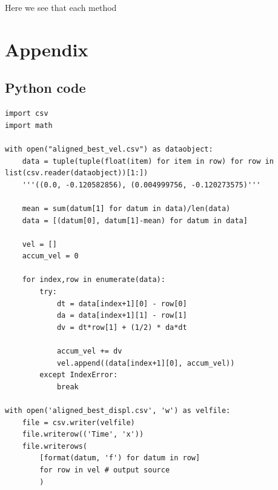 \documentclass[12pt]{article}
\begin{document}
    

Here we see that each method 
    
\section{Appendix}

\subsection{Python code}
\begin{verbatim}
import csv
import math

with open("aligned_best_vel.csv") as dataobject:
    data = tuple(tuple(float(item) for item in row) for row in list(csv.reader(dataobject))[1:])
    '''((0.0, -0.120582856), (0.004999756, -0.120273575)'''
    
    mean = sum(datum[1] for datum in data)/len(data)
    data = [(datum[0], datum[1]-mean) for datum in data]

    vel = []
    accum_vel = 0

    for index,row in enumerate(data):
        try:
            dt = data[index+1][0] - row[0]
            da = data[index+1][1] - row[1]
            dv = dt*row[1] + (1/2) * da*dt

            accum_vel += dv
            vel.append((data[index+1][0], accum_vel))
        except IndexError:
            break

with open('aligned_best_displ.csv', 'w') as velfile:
    file = csv.writer(velfile)
    file.writerow(('Time', 'x'))
    file.writerows(
        [format(datum, 'f') for datum in row]
        for row in vel # output source
        )
\end{verbatim}
    
\end{document}
